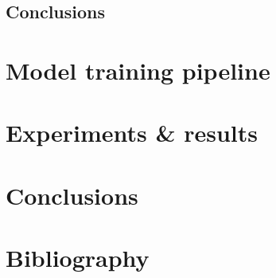 \documentclass[11pt, a4paper]{article}
\begin{document}
	\subsection{Conclusions}
	
	\section{Model training pipeline}
	\section{Experiments \& results}
	\section{Conclusions}
	\section{Bibliography}

	
	
\end{document}
